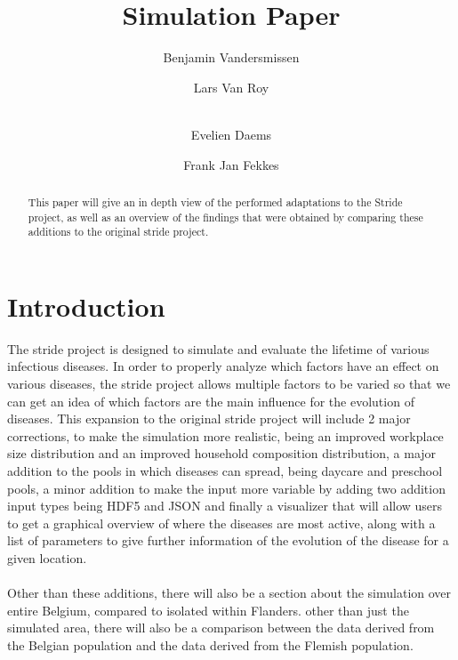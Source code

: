 \documentclass[runningheads]{llncs}
\begin{document}
	\title{Simulation Paper}
	
	\author{Benjamin Vandersmissen \and
		Lars Van Roy \and \\
		Evelien Daems \and
		Frank Jan Fekkes}
	\maketitle              %
	\begin{abstract}
		This paper will give an in depth view of the performed adaptations to the Stride project, as well as an overview of the findings that were obtained by comparing these additions to the original stride project. 
		
		
	\end{abstract}
	
	
	\section{Introduction}
	The stride project is designed to simulate and evaluate the lifetime of various infectious diseases. In order to properly analyze which factors have an effect on various diseases, the stride project allows multiple factors to be varied so that we can get an idea of which factors are the main influence  for the evolution of diseases. This expansion to the original stride project will include 2 major corrections, to make the simulation more realistic, being an improved workplace size distribution and an improved household composition distribution, a major addition to the pools in which diseases can spread, being daycare and preschool pools, a minor addition to make the input more variable by adding two addition input types being HDF5 and JSON and finally a visualizer that will allow users to get a graphical overview of where the diseases are most active, along with a list of parameters to give further information of the evolution of the disease for a given location. \\
	\\
	Other than these additions, there will also be a section about the simulation over entire Belgium, compared to isolated within Flanders. other than just the simulated area, there will also be a comparison between the data derived from the Belgian population and the data derived from the Flemish population.
	
\end{document}
